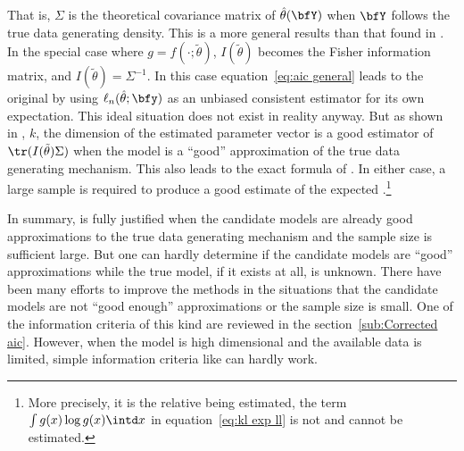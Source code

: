 That is, $\Sigma$ is the theoretical covariance matrix of $\hat\theta(\bfY)$
when $\bfY$ follows the true data generating density. This is a more general
results than that found in \cite{Akaike:1973uc}. In the special case where $g
= f(\cdot;\tilde\theta)$, $I(\tilde\theta)$ becomes the Fisher information
matrix, and $I(\tilde\theta) = \Sigma^{-1}$. In this case
equation~\eqref{eq:aic general} leads to the original \aic by using
$\ell_n(\hat\theta;\bfy)$ as an unbiased consistent estimator for its own
expectation. This ideal situation does not exist in reality anyway. But as
shown in \cite{Shibata:1989tm}, $k$, the dimension of the estimated parameter
vector is a good estimator of $\tr(I(\tilde\theta)\Sigma)$ when the model is a
``good'' approximation of the true data generating mechanism. This also leads
to the exact formula of \aic. In either case, a large sample is required to
produce a good estimate of the expected \kl.\footnote{More precisely, it is
  the relative \kl being estimated, the term $\int g(x)\log g(x)\intd x$ in
  equation~\eqref{eq:kl exp ll} is not and cannot be estimated.}

In summary, \aic is fully justified when the candidate models are already good
approximations to the true data generating mechanism and the sample size is
sufficient large. But one can hardly determine if the candidate models are
``good'' approximations while the true model, if it exists at all, is unknown.
There have been many efforts to improve the \aic methods in the situations
that the candidate models are not ``good enough'' approximations or the sample
size is small. One of the information criteria of this kind are reviewed in
the section~\ref{sub:Corrected aic}. However, when the model is high
dimensional and the available data is limited, simple information criteria
like \aic can hardly work.
